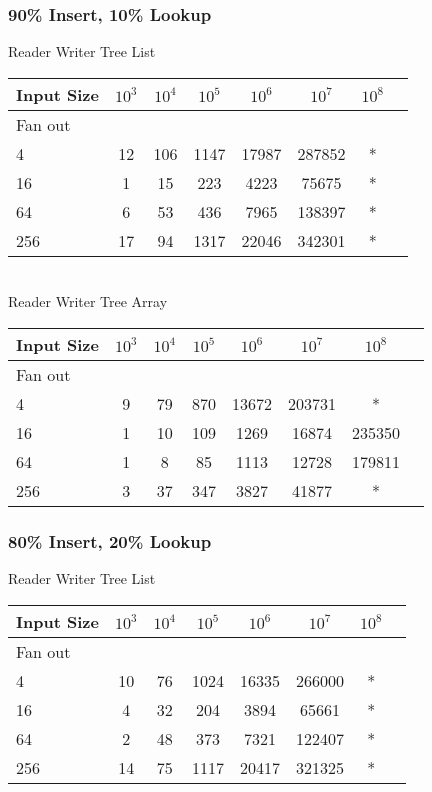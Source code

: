 \documentclass{sig-alternate}
\begin{document}
\subsubsection{90\% Insert, 10\% Lookup}
Reader Writer Tree List \\
\begin{tabular}{| l | c | c | c | c | c | c | r}
  \hline
  Input Size & $10^3$ & $10^4$ & $10^5$ & $10^6$ & $10^7$ & $10^8$ \\ \hline
  Fan out & & & & & &  \\  \hline
  4			&	12 & 106 & 1147 & 17987 & 287852 & * \\
  16		&	1 & 15 & 223 & 4223 & 75675 & * \\
  64		&	6 & 53 & 436 & 7965 & 138397 & * \\
  256		&	17 & 94 & 1317 & 22046 & 342301 & * \\
  \hline
\end{tabular} \\

Reader Writer Tree Array \\
\begin{tabular}{| l | c | c | c | c | c | c | r}
  \hline
  Input Size & $10^3$ & $10^4$ & $10^5$ & $10^6$ & $10^7$ & $10^8$ \\ \hline
  Fan out & & & & & &  \\  \hline
  4			&	9 & 79 & 870 & 13672 & 203731 & * \\
  16		&	1 & 10 & 109 & 1269 & 16874 & 235350 \\
  64		&	1 & 8 & 85 & 1113 & 12728 & 179811 \\
  256		&	3 & 37 & 347 & 3827 & 41877 & * \\
  \hline
\end{tabular} 

\subsubsection{80\% Insert, 20\% Lookup}
Reader Writer Tree List \\
\begin{tabular}{| l | c | c | c | c | c | c | r}
  \hline
  Input Size & $10^3$ & $10^4$ & $10^5$ & $10^6$ & $10^7$ & $10^8$ \\ \hline
  Fan out & & & & & &  \\  \hline
  4			&	10 & 76 & 1024 & 16335 & 266000 & * \\
  16		&	4 & 32 & 204 & 3894 & 65661 & * \\
  64		&	2 & 48 & 373 & 7321 & 122407 & * \\
  256		&	14 & 75 & 1117 & 20417 & 321325 & * \\
  \hline
\end{tabular} \\
\end{document}
